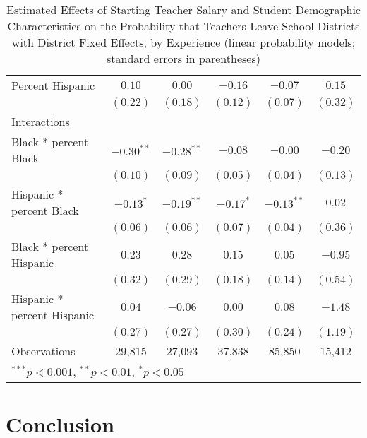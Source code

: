 \documentclass[]{article}
\begin{document}
\begin{table}
\begin{center}
\begin{tabular}{l c c c c c }
\quad Percent Hispanic                      & $0.10$       & $0.00$       & $-0.16$       & $-0.07$      & $0.15$        \\
                                            & $(0.22)$     & $(0.18)$     & $(0.12)$      & $(0.07)$     & $(0.32)$      \\
Interactions                                &              &              &               &              &               \\
\quad Black * percent Black                 & $-0.30^{**}$ & $-0.28^{**}$ & $-0.08$       & $-0.00$      & $-0.20$       \\
                                            & $(0.10)$     & $(0.09)$     & $(0.05)$      & $(0.04)$     & $(0.13)$      \\
\quad Hispanic * percent Black              & $-0.13^{*}$  & $-0.19^{**}$ & $-0.17^{*}$   & $-0.13^{**}$ & $0.02$        \\
                                            & $(0.06)$     & $(0.06)$     & $(0.07)$      & $(0.04)$     & $(0.36)$      \\
\quad Black * percent Hispanic              & $0.23$       & $0.28$       & $0.15$        & $0.05$       & $-0.95$       \\
                                            & $(0.32)$     & $(0.29)$     & $(0.18)$      & $(0.14)$     & $(0.54)$      \\
\quad Hispanic * percent Hispanic           & $0.04$       & $-0.06$      & $0.00$        & $0.08$       & $-1.48$       \\
                                            & $(0.27)$     & $(0.27)$     & $(0.30)$      & $(0.24)$     & $(1.19)$      \\
\hline
Observations                                & 29,815        & 27,093        & 37,838         & 85,850        & 15,412         \\
\hline
\multicolumn{6}{l}{\scriptsize{$^{***}p<0.001$, $^{**}p<0.01$, $^*p<0.05$}}
\end{tabular}
\caption{Estimated Effects of Starting Teacher Salary and Student Demographic Characteristics on the Probability that Teachers Leave School Districts with District Fixed Effects, by Experience (linear probability models; standard errors in parentheses)}
\label{tbl:reg_lpm_fe}
\end{center}
\end{table}

\section{Conclusion}\label{conclusion}
\end{document}
